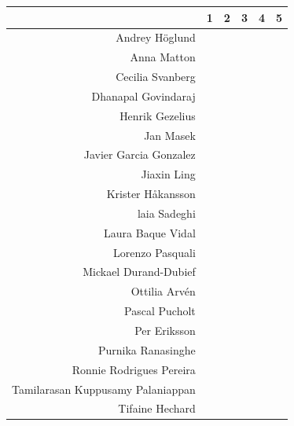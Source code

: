 \documentclass[12pt]{article}\usepackage[]{graphicx}\usepackage[]{color}
\begin{document}


\begin{table}[ht]
\centering
\begin{tabular}{r|L{3cm}|L{3cm}|L{3cm}|L{3cm}|L{3cm}}
  \toprule
 & 1 & 2 & 3 & 4 & 5 \\ 
  \midrule
Andrey H\"oglund &  &  &  &  &  \\ 
   Anna Matton &  &  &  &  &  \\ 
  Cecilia Svanberg &  &  &  &  &  \\ 
   Dhanapal Govindaraj &  &  &  &  &  \\ 
  Henrik Gezelius &  &  &  &  &  \\ 
   Jan Masek &  &  &  &  &  \\ 
  Javier Garcia Gonzalez &  &  &  &  &  \\ 
   Jiaxin Ling &  &  &  &  &  \\ 
  Krister H{\aa}kansson &  &  &  &  &  \\ 
   laia Sadeghi &  &  &  &  &  \\ 
  Laura Baque Vidal &  &  &  &  &  \\ 
   Lorenzo Pasquali &  &  &  &  &  \\ 
  Mickael Durand-Dubief &  &  &  &  &  \\ 
   Ottilia Arv\'en &  &  &  &  &  \\ 
  Pascal Pucholt &  &  &  &  &  \\ 
   Per Eriksson &  &  &  &  &  \\ 
  Purnika Ranasinghe &  &  &  &  &  \\ 
   Ronnie Rodrigues Pereira &  &  &  &  &  \\ 
  Tamilarasan Kuppusamy Palaniappan &  &  &  &  &  \\ 
   Tifaine Hechard &  &  &  &  &  \\ 
   \bottomrule
\end{tabular}
\end{table}
\end{document}
